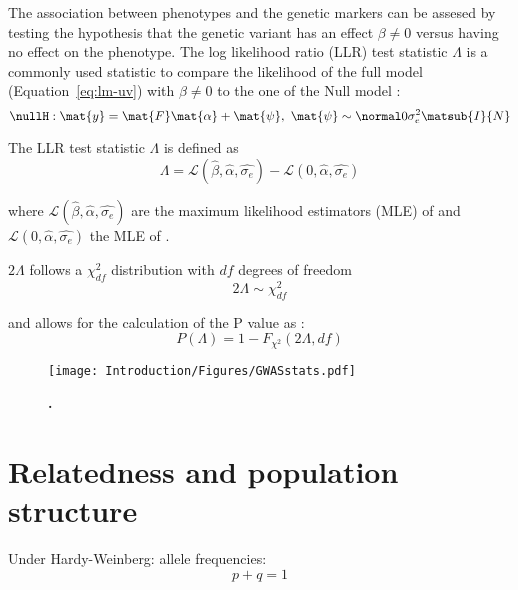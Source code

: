\noindent The association between phenotypes and the genetic markers can be assesed by testing the hypothesis that the genetic variant has an effect \(\beta \neq 0\) versus having no effect on the phenotype. The log likelihood ratio (LLR) test statistic \(\Lambda\) is a commonly used statistic to compare the likelihood of the full model \taltH (Equation~\ref{eq:lm-uv}) with \(\beta \neq 0\) to the one of the Null model \tnullH:
\begin{equation}
\nullH: \mat{y} =\mat{F}\mat{\alpha}  + \mat{\psi},\text{ }
\mat{\psi}\sim \normal 0 {\sigma_e^2\matsub{I}{N}}
\label{eq:lm_null}
\end{equation}

\noindent The LLR test statistic \(\Lambda\) is defined as
\begin{equation}
\Lambda  =  \mathcal{L} (\hat{\beta}, \hat{\alpha}, \hat{\sigma_{e}}) -  \mathcal{L} (0, \hat{\alpha}, \hat{\sigma_{e}})
\label{eq:llr}
\end{equation}

\noindent where \(\mathcal{L} (\hat{\beta}, \hat{\alpha}, \hat{\sigma_{e}})\) are the maximum likelihood estimators (MLE) of  \taltH and \(\mathcal{L} (0, \hat{\alpha}, \hat{\sigma_{e}})\) the MLE of \tnullH. 

\noindent \(2\Lambda\) follows a \(\chi^2_{df}\) distribution with \(df\) degrees of freedom \citep{Wilks1938} 
\begin{equation}
2\Lambda \sim \chi^2_{df} 
\label{eq:lambda}
\end{equation}

\noindent and allows for the calculation of the P value as :
\begin{equation}
P(\Lambda) = 1 - F_{\chi^2}(2\Lambda, df)
\label{eq:pvalue}
\end{equation}

\begin{figure}[hbtp]
	\centering
	\texttt{[image: Introduction/Figures/GWASstats.pdf]}
	\caption[\textbf{.}]{\textbf{.} } 
	 	\label{fig:GWAs-stats}
\end{figure}

\section{Relatedness and population structure}

Under Hardy-Weinberg:
allele frequencies: 
\begin{equation}
p + q =1
\end{equation} 

